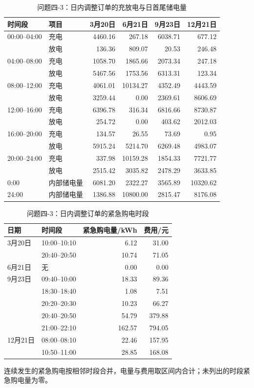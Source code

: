 \begin{table}[H]
\centering
\small
{}
\setlength{\tabcolsep}{5pt}
\caption{问题四-3：日内调整订单的充放电与日首尾储电量}
\label{tab:app43_storage}
\begin{tabular}{llrrrr}
\toprule
时间段 & 项目 & 3月20日 & 6月21日 & 9月23日 & 12月21日 \\
\midrule
00:00--04:00 & 充电 & 4460.16 & 267.18 & 6038.71 & 677.12 \\
 & 放电 & 136.36 & 809.07 & 20.53 & 246.48 \\
04:00--08:00 & 充电 & 1058.70 & 1865.66 & 2073.34 & 247.18 \\
 & 放电 & 5467.56 & 1753.56 & 6313.31 & 123.34 \\
08:00--12:00 & 充电 & 4061.01 & 10134.27 & 4352.49 & 4443.59 \\
 & 放电 & 3259.44 & 0.00 & 2369.61 & 8606.69 \\
12:00--16:00 & 充电 & 6396.78 & 316.34 & 6816.66 & 8730.87 \\
 & 放电 & 254.72 & 0.00 & 403.62 & 2012.03 \\
16:00--20:00 & 充电 & 134.57 & 26.55 & 73.69 & 0.95 \\
 & 放电 & 5915.24 & 5214.70 & 6269.48 & 4983.07 \\
20:00--24:00 & 充电 & 337.98 & 10159.28 & 1854.33 & 7721.77 \\
 & 放电 & 2515.42 & 3035.82 & 2478.29 & 3633.85 \\
0:00 & 内部储电量 & 6081.20 & 2322.27 & 3565.89 & 10320.62 \\
24:00 & 内部储电量 & 1386.88 & 10800.00 & 2815.47 & 8176.08 \\
\bottomrule
\end{tabular}
\end{table}

\begin{table}[H]
\centering
\small
{}
\setlength{\tabcolsep}{5pt}
\caption{问题四-3：日内调整订单的紧急购电时段}
\label{tab:app43_emergency}
\begin{tabular}{llrr}
\toprule
日期 & 时间段 & 紧急购电量/kWh & 费用/元 \\
\midrule
3月20日 & 10:00--10:10 & 6.12 & 31.00 \\
 & 20:40--20:50 & 10.74 & 71.05 \\
6月21日 & 无 & 0.00 & 0.00 \\
9月23日 & 09:40--10:00 & 18.33 & 89.36 \\
 & 18:30--18:40 & 1.08 & 7.51 \\
 & 20:20--20:30 & 10.23 & 66.27 \\
 & 20:40--20:50 & 54.79 & 379.88 \\
 & 21:00--22:10 & 162.57 & 794.05 \\
12月21日 & 08:00--08:10 & 22.46 & 157.95 \\
 & 10:50--11:00 & 28.85 & 168.08 \\
\bottomrule
\end{tabular}
\end{table}

连续发生的紧急购电按相邻时段合并，电量与费用取区间内合计；未列出的时段紧急购电量为零。
